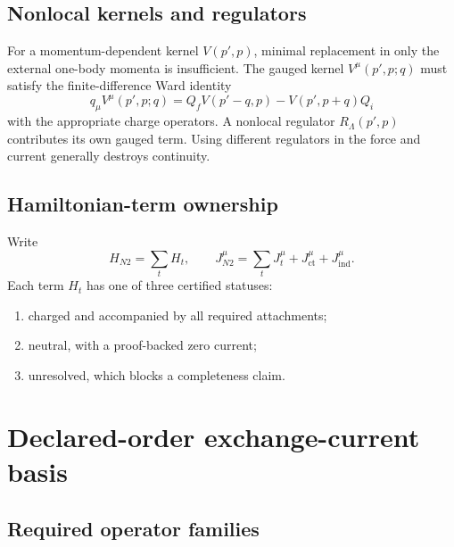 \documentclass[11pt]{article}
\newcommand{\ind}{\mathrm{ind}}
\newcommand{\ct}{\mathrm{ct}}
\begin{document}
\subsection{Nonlocal kernels and regulators}

For a momentum-dependent kernel \(V(p',p)\), minimal replacement in only the
external one-body momenta is insufficient.  The gauged kernel
\(V^\mu(p',p;q)\) must satisfy the finite-difference Ward identity
\begin{equation}
 q_\mu V^\mu(p',p;q)
 =
 Q_f V(p'-q,p)-V(p',p+q)Q_i
 \label{eq:kernel-ward}
\end{equation}
with the appropriate charge operators.  A nonlocal regulator
\(R_\Lambda(p',p)\) contributes its own gauged term.  Using different
regulators in the force and current generally destroys continuity.

\subsection{Hamiltonian-term ownership}

Write
\begin{equation}
 H_{N2}
 =
 \sum_t H_t,
 \qquad
 J^\mu_{N2}
 =
 \sum_t J_t^\mu+
 J_{\ct}^\mu+J_{\ind}^\mu.
 \label{eq:term-current-sum}
\end{equation}
Each term \(H_t\) has one of three certified statuses:
\begin{enumerate}
\item charged and accompanied by all required attachments;
\item neutral, with a proof-backed zero current;
\item unresolved, which blocks a completeness claim.
\end{enumerate}

\section{Declared-order exchange-current basis}
\label{sec:current-basis}

\subsection{Required operator families}
\end{document}
